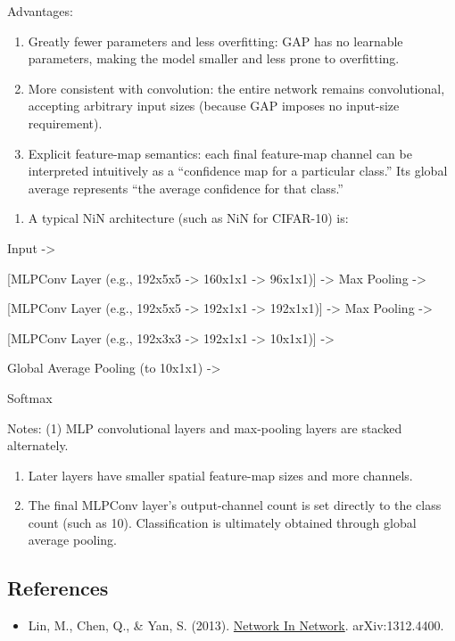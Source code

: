 Advantages:

\begin{enumerate}
\def\labelenumi{(\arabic{enumi})}
\item
  Greatly fewer parameters and less overfitting: GAP has no learnable parameters, making the model smaller and less prone to overfitting.
\item
  More consistent with convolution: the entire network remains convolutional, accepting arbitrary input sizes (because GAP imposes no input-size requirement).
\item
  Explicit feature-map semantics: each final feature-map channel can be interpreted intuitively as a ``confidence map for a particular class.'' Its global average represents ``the average confidence for that class.''
\end{enumerate}

\begin{enumerate}
\def\labelenumi{\arabic{enumi}.}
\setcounter{enumi}{2}
\tightlist
\item
{}
  A typical NiN architecture (such as NiN for CIFAR-10) is:
\end{enumerate}

Input -\textgreater{}

{[}MLPConv Layer (e.g., 192x5x5 -\textgreater{} 160x1x1 -\textgreater{} 96x1x1){]} -\textgreater{} Max Pooling -\textgreater{}

{[}MLPConv Layer (e.g., 192x5x5 -\textgreater{} 192x1x1 -\textgreater{} 192x1x1){]} -\textgreater{} Max Pooling -\textgreater{}

{[}MLPConv Layer (e.g., 192x3x3 -\textgreater{} 192x1x1 -\textgreater{} 10x1x1){]} -\textgreater{}

Global Average Pooling (to 10x1x1) -\textgreater{}

Softmax

Notes: (1) MLP convolutional layers and max-pooling layers are stacked alternately.

\begin{enumerate}
\def\labelenumi{(\arabic{enumi})}
\setcounter{enumi}{1}
\item
  Later layers have smaller spatial feature-map sizes and more channels.
\item
  The final MLPConv layer's output-channel count is set directly to the class count (such as 10). Classification is ultimately obtained through global average pooling.
\end{enumerate}

\FloatBarrier
{}
\hypertarget{references-12}{%
\subsection{References}\label{references-12}}

\vspace{0.25em}
\begin{itemize}
\tightlist
\item
  Lin, M., Chen, Q., \& Yan, S. (2013). \href{https://arxiv.org/abs/1312.4400}{Network In Network}. arXiv:1312.4400.
\end{itemize}

\clearpage
